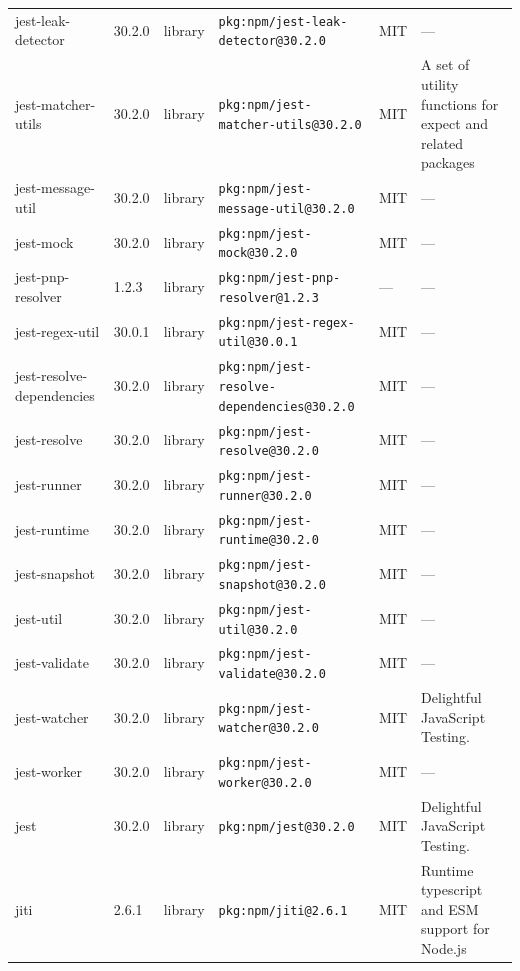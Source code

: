 \documentclass[11pt,a4paper]{article}
\begin{document}
\begin{longtable}{|p{4cm}|p{2cm}|p{1.6cm}|p{5cm}|p{1.5cm}|p{3.5cm}|}
\raggedright jest-leak-detector & 30.2.0 & library & \small\texttt{pkg:npm/jest-leak-detector@30.2.0} & MIT & \small — \\
\raggedright jest-matcher-utils & 30.2.0 & library & \small\texttt{pkg:npm/jest-matcher-utils@30.2.0} & MIT & \small A set of utility functions for expect and related packages \\
\raggedright jest-message-util & 30.2.0 & library & \small\texttt{pkg:npm/jest-message-util@30.2.0} & MIT & \small — \\
\raggedright jest-mock & 30.2.0 & library & \small\texttt{pkg:npm/jest-mock@30.2.0} & MIT & \small — \\
\raggedright jest-pnp-resolver & 1.2.3 & library & \small\texttt{pkg:npm/jest-pnp-resolver@1.2.3} & — & \small — \\
\raggedright jest-regex-util & 30.0.1 & library & \small\texttt{pkg:npm/jest-regex-util@30.0.1} & MIT & \small — \\
\raggedright jest-resolve-dependencies & 30.2.0 & library & \small\texttt{pkg:npm/jest-resolve-dependencies@30.2.0} & MIT & \small — \\
\raggedright jest-resolve & 30.2.0 & library & \small\texttt{pkg:npm/jest-resolve@30.2.0} & MIT & \small — \\
\raggedright jest-runner & 30.2.0 & library & \small\texttt{pkg:npm/jest-runner@30.2.0} & MIT & \small — \\
\raggedright jest-runtime & 30.2.0 & library & \small\texttt{pkg:npm/jest-runtime@30.2.0} & MIT & \small — \\
\raggedright jest-snapshot & 30.2.0 & library & \small\texttt{pkg:npm/jest-snapshot@30.2.0} & MIT & \small — \\
\raggedright jest-util & 30.2.0 & library & \small\texttt{pkg:npm/jest-util@30.2.0} & MIT & \small — \\
\raggedright jest-validate & 30.2.0 & library & \small\texttt{pkg:npm/jest-validate@30.2.0} & MIT & \small — \\
\raggedright jest-watcher & 30.2.0 & library & \small\texttt{pkg:npm/jest-watcher@30.2.0} & MIT & \small Delightful JavaScript Testing. \\
\raggedright jest-worker & 30.2.0 & library & \small\texttt{pkg:npm/jest-worker@30.2.0} & MIT & \small — \\
\raggedright jest & 30.2.0 & library & \small\texttt{pkg:npm/jest@30.2.0} & MIT & \small Delightful JavaScript Testing. \\
\raggedright jiti & 2.6.1 & library & \small\texttt{pkg:npm/jiti@2.6.1} & MIT & \small Runtime typescript and ESM support for Node.js \\

\end{longtable}
\end{document}

